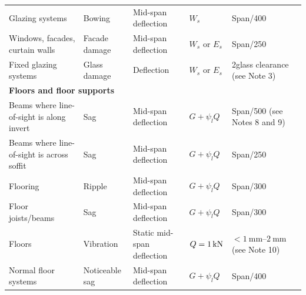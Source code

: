 \begin{table}
\begin{tabular}{lllll}
	Glazing systems                                                  & Bowing                                & Mid-span deflection               & $W_s$                       & Span/400                                      \\
	Windows, facades, curtain walls                                  & Facade damage                         & Mid-span deflection               & $W_s$ or $E_s$              & Span/250                                      \\
	Fixed glazing systems                                            & Glass damage                          & Deflection                        & $W_s$ or $E_s$              & 2\texttimes{}glass clearance (see Note 3)     \\ \midrule
	\multicolumn{5}{l}{\textbf{Floors and floor supports}}                                                                                                                                                                     \\ \midrule
	Beams where line-of-sight is along invert                        & Sag                                   & Mid-span deflection               & $G+\psi_lQ$                 & Span/500 (see Notes 8 and 9)                 \\
	Beams where line-of-sight is across soffit                       & Sag                                   & Mid-span deflection               & $G+\psi_lQ$                 & Span/250                                      \\
	Flooring                                                         & Ripple                                & Mid-span deflection               & $G+\psi_lQ$                 & Span/300                                      \\
	Floor joists/beams                                               & Sag                                   & Mid-span deflection               & $G+\psi_lQ$                 & Span/300                                      \\
	Floors                                                           & Vibration                             & Static mid-span deflection        & $Q=\SI{1}{\kilo\newton}$             & $<\qtyrange{1}{2}{\mm}$ (see Note 10)         \\
	Normal floor systems                                             & Noticeable sag                        & Mid-span deflection               & $G+\psi_lQ$                 & Span/400                                      \\

\end{tabular}
\end{table}
